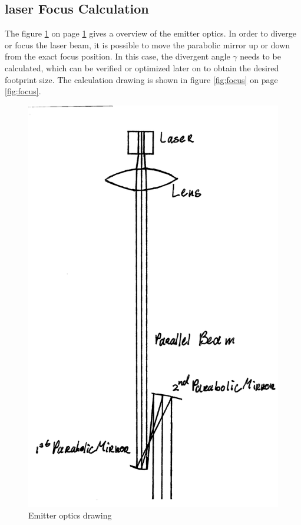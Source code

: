 \subsection{\acs{laser} Focus Calculation}
\label{focus}
The figure \ref{fig:EmitterOptics} on page \ref{fig:EmitterOptics} gives a overview of the emitter optics. In order to diverge or focus the laser beam, it is possible to move the parabolic mirror up or down from the exact focus position. In this case, the divergent angle $\gamma$ needs to be calculated, which can be verified or optimized later on to obtain the desired footprint size. The calculation drawing is shown in figure \ref{fig:focus} on page \ref{fig:focus}.

\begin{figure}[ht!]
\centering
\includegraphics[scale = 0.8]{chapters/img/EmitterOptics.png}
\caption{Emitter optics drawing}
\label{fig:EmitterOptics}
\end{figure}

